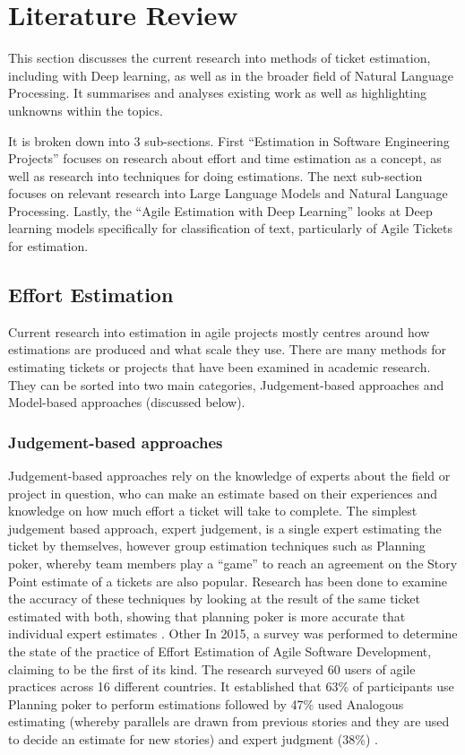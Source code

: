 \documentclass{UoYCSproject}
\begin{document}
    \chapter{Literature Review}
    \label{ch:literature-review}
    This section discusses the current research into methods of ticket estimation, including with Deep learning, as well as in the broader field of Natural Language Processing.
    It summarises and analyses existing work as well as highlighting unknowns within the topics.

    It is broken down into 3 sub-sections.
    First “Estimation in Software Engineering Projects” focuses on research about effort and time estimation as a concept, as well as research into techniques for doing estimations.
    The next sub-section focuses on relevant research into Large Language Models and Natural Language Processing.
    Lastly, the “Agile Estimation with Deep Learning” looks at Deep learning models specifically for classification of text, particularly of Agile Tickets for estimation.


    \section{Effort Estimation}
    \label{sec:effort-estimation}
    Current research into estimation in agile projects mostly centres around how estimations are produced and what scale they use.
    There are many methods for estimating tickets or projects that have been examined in academic research.
    They can be sorted into two main categories, Judgement-based approaches and Model-based approaches (discussed below).

    \subsection{Judgement-based approaches}
    \label{subsec:judgement-based-approaches}

    Judgement-based approaches rely on the knowledge of experts about the field or project in question, who can make an estimate based on their experiences and knowledge on how much effort a ticket will take to complete.
    The simplest judgement based approach, expert judgement, is a single expert estimating the ticket by themselves, however group estimation techniques such as Planning poker, whereby team members play a “game” to reach an agreement on the Story Point estimate of a tickets are also popular.
    Research has been done to examine the accuracy of these techniques by looking at the result of the same ticket estimated with both, showing that planning poker is more accurate that individual expert estimates \cite{MAHNIC20122086, RashidSCE}. Other
    In 2015, a survey was performed to determine the state of the practice of Effort Estimation of Agile Software Development, claiming to be the first of its kind.
    The research surveyed 60 users of agile practices across 16 different countries. It established that 63\% of participants use Planning poker to perform estimations followed by 47\% used Analogous estimating (whereby parallels are drawn from previous stories and they are used to decide an estimate for new stories) and expert judgment (38\%) \cite{effortestimationsurvey}.
\end{document}
